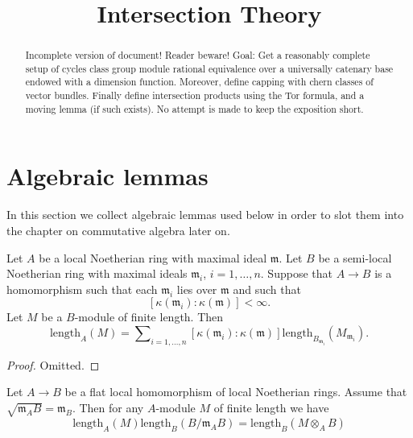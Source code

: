 

%


\title{Intersection Theory}

\begin{abstract}
Incomplete version of document! Reader beware!
Goal: Get a reasonably complete setup of
cycles class group module rational equivalence
over a universally catenary base endowed with a dimension
function. Moreover, define capping with chern classes of
vector bundles. Finally define intersection products using
the Tor formula, and a moving lemma (if such exists).
No attempt is made to keep the exposition short.
\end{abstract}

\maketitle

\label{section-phantom}


\tableofcontents



\section{Algebraic lemmas}
\label{section-algebraic-lemmas}

\noindent
In this section we collect algebraic lemmas used below in order to
slot them into the chapter on commutative algebra later on.

\begin{lemma}
\label{lemma-pushdown-module}
Let $A$ be a local Noetherian ring with maximal ideal $\mathfrak m$.
Let $B$ be a semi-local Noetherian ring with maximal ideals $\mathfrak m_i$,
$i = 1, \ldots, n$.
Suppose that $A \to B$ is a homomorphism such that each $\mathfrak m_i$
lies over $\mathfrak m$ and such that
$$
[\kappa(\mathfrak m_i) : \kappa(\mathfrak m)] < \infty.
$$
Let $M$ be a $B$-module of finite length.
Then
$$
\text{length}_A(M) = \sum\nolimits_{i = 1, \ldots, n}
[\kappa(\mathfrak m_i) : \kappa(\mathfrak m)]
\text{length}_{B_{\mathfrak m_i}}(M_{\mathfrak m_i}).
$$
\end{lemma}

\begin{proof}
Omitted.
\end{proof}

\begin{lemma}
\label{lemma-pullback-module}
Let $A \to B$ be a flat local homomorphism of local Noetherian rings.
Assume that $\sqrt{\mathfrak m_A B} = \mathfrak m_B$.
Then for any $A$-module $M$ of finite length we have
$$
\text{length}_A(M) \text{length}_B(B/\mathfrak m_AB)
=
\text{length}_B(M \otimes_A B)
$$
\end{lemma}

